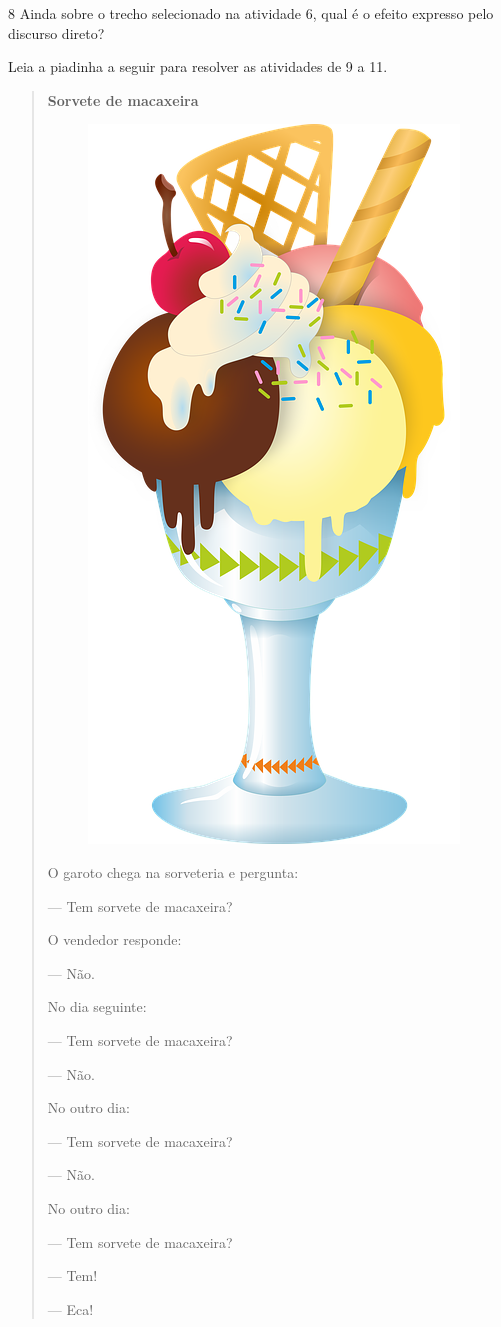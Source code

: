 \num{8} Ainda sobre o trecho selecionado na atividade 6, qual é o efeito expresso pelo discurso direto?


Leia a piadinha a seguir para resolver as atividades de 9 a 11.



\begin{quote}
\textbf{Sorvete de macaxeira}

\begin{figure}
\includegraphics[width=.3\textwidth]{./media/image20.png}
\end{figure}

O garoto chega na sorveteria e pergunta:

--- Tem sorvete de macaxeira?

O vendedor responde:

--- Não.

No dia seguinte:

--- Tem sorvete de macaxeira?

--- Não.

No outro dia:

--- Tem sorvete de macaxeira?

--- Não.

No outro dia:

--- Tem sorvete de macaxeira?

--- Tem!

--- Eca!

\end{quote}

